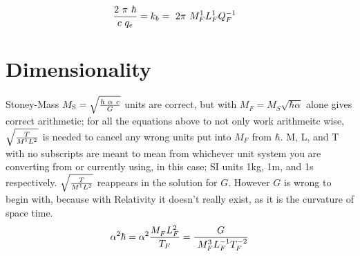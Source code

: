 \begin{multicols}{2}
\begin{multicols}{2}[\setlength{\columnseprule}{0pt}]
\begin{align*}
{2~\pi~\hbar \over c ~ q_e}=k_b = ~2\pi & ~M_F^{1}L_F^{1}Q_F^{-1}
\end{align*}\noindent\end{multicols}\noindent
\noindent\section {Dimensionality}Stoney-Mass $M_{{\text{S}}} = \sqrt{\hbar ~ \alpha ~c \over G}$ units are correct, but with $M_F = M_S \sqrt{\hbar \alpha}$ alone gives correct arithmetic;
 for all the equations above to not only work arithmeitc wise, $\sqrt{T \over M^{1}L^{2}}$ is needed to cancel any wrong units put into $M_F$ from $\hbar$. M, L, and T with no subscripts are meant to mean from whichever unit system you are converting from or currently using, in this case; SI units 1kg, 1m, and 1s respectively.
$\sqrt{T \over M^{1}L^{2}}$ reappears in the solution for $G$. However $G$ is wrong to begin with, because with Relativity it doesn't really exist, as it is the curvature of space time.
$$\alpha^2\hbar= \alpha^2 {M_F^{}L_F^{2} \over T_F} ={G \over ~M_F^{3}L_F^{-1}T_F^{-2}}$$


\end{multicols}
